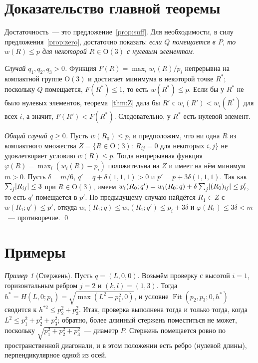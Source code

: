 \documentclass[11pt]{article}
\theoremstyle{definition}
\theoremstyle{remark}
\newtheorem{example}[theorem]{Пример}
\newcommand{\Ort}{\mathrm{O}(3)}
\newcommand{\Fit}{\operatorname{Fit}}
\DeclarePairedDelimiter{\abs}{\lvert}{\rvert}
\begin{document}
\section{Доказательство главной теоремы}\label{sec:proof}

Достаточность~--- это предложение~\ref{prop:suff}. Для необходимости, в силу
предложения~\ref{prop:zero}, достаточно показать: \emph{если $Q$ помещается в $P$, то $w(R)\le p$
для некоторой $R\in\Ort$ с нулевым элементом.}

\emph{Случай $q_1,q_2,q_3>0$.} Функция $F(R)=\max_iw_i(R)/p_i$ непрерывна на компактной группе
$\Ort$ и достигает минимума в некоторой точке $R^*$; поскольку $Q$ помещается, $F(R^*)\le1$, то есть
$w(R^*)\le p$. Если бы у $R^*$ не было нулевых элементов, теорема~\ref{thm:Z} дала бы $R'$ с
$w_i(R')<w_i(R^*)$ для всех $i$, а значит, $F(R')<F(R^*)$. Следовательно, у $R^*$ есть нулевой
элемент.

\emph{Общий случай $q\ge0$.} Пусть $w(R_0)\le p$, и предположим, что ни одна $R$ из компактного
множества $Z=\{R\in\Ort:\ R_{ij}=0\text{ для некоторых }i,j\}$ не удовлетворяет условию $w(R)\le p$.
Тогда непрерывная функция $\varphi(R)=\max_i(w_i(R)-p_i)$ положительна на $Z$ и имеет на нём минимум
$m>0$. Пусть $\delta=m/6$, $q'=q+\delta(1,1,1)>0$ и $p'=p+3\delta(1,1,1)$. Так как
$\sum_j\abs{R_{ij}}\le3$ при $R\in\Ort$, имеем
$w_i(R_0;q')=w_i(R_0;q)+\delta\sum_j\abs{(R_0)_{ij}}\le p_i'$, то есть $q'$ помещается в $p'$. По
предыдущему случаю найдётся $R_1\in Z$ с $w(R_1;q')\le p'$, откуда
$w_i(R_1;q)\le w_i(R_1;q')\le p_i+3\delta$ и $\varphi(R_1)\le3\delta<m$~--- противоречие. \qed

\section{Примеры}\label{sec:examples}

\begin{example}[Стержень]
Пусть $q=(L,0,0)$. Возьмём проверку с высотой $i=1$, горизонтальным ребром $j=2$ и $(k,l)=(1,3)$.
Тогда $h^*=H(L,0;p_1)=\sqrt{\max(L^2-p_1^2,0)}$, и условие $\Fit(p_2,p_3;0,h^*)$ сводится к
$h^{*2}\le p_2^2+p_3^2$. Итак, проверка выполнена тогда и только тогда, когда
$L^2\le p_1^2+p_2^2+p_3^2$; обратно, более длинный стержень поместиться не может, поскольку
$\sqrt{p_1^2+p_2^2+p_3^2}$~--- диаметр $P$. Стержень помещается ровно по пространственной диагонали,
и в этом положении есть ребро (нулевой длины), перпендикулярное одной из осей.
\end{example}
\end{document}
